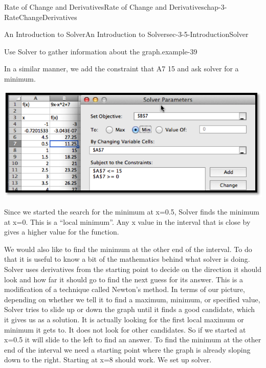 \documentclass[oneside,10pt,]{book}
\numberwithin{equation}{section}
\begin{document}
\begin{chapterptx}{Rate of Change and Derivatives}{}{Rate of Change and Derivatives}{}{}{chap-3-RateChangeDerivatives}
\begin{sectionptx}{An Introduction to Solver}{}{An Introduction to Solver}{}{}{sec-3-5-IntroductionSolver}
\begin{example}{Use Solver to gather information about the graph.}{example-39}
\begin{sidebyside}{1}{0.3}{0.3}{0}
\begin{sbspanel}{0.4}
\end{sbspanel}%
\end{sidebyside}%
\par
\hypertarget{p-1338}{}%
In a similar manner, we add the constraint that A7 15 and ask solver for a minimum.%
\begin{sidebyside}{1}{0.15}{0.15}{0}%
\begin{sbspanel}{0.7}%
\includegraphics[width=1\linewidth]{images/sec3-5-7.png}
\end{sbspanel}%
\end{sidebyside}%
\par
\hypertarget{p-1339}{}%
Since we started the search for the minimum at x=0.5, Solver finds the minimum at x=0.  This is a ``local minimum''.  Any x value in the interval that is close by gives a higher value for the function.%
\par
\hypertarget{p-1340}{}%
We would also like to find the minimum at the other end of the interval.  To do that it is useful to know a bit of the mathematics behind what solver is doing.  Solver uses derivatives from the starting point to decide on the direction it should look and how far it should go to find the next guess for its answer.  This is a modification of a technique called Newton’s method.  In terms of our picture, depending on whether we tell it to find a maximum, minimum, or specified value, Solver tries to slide up or down the graph until it finds a good candidate, which it gives us as a solution.  It is actually looking for the first local maximum or minimum it gets to.  It does not look for other candidates.  So if we started at x=0.5 it will slide to the left to find an answer.  To find the minimum at the other end of the interval we need a starting point where the graph is already sloping down to the right. Starting at x=8 should work.  We set up solver.%
\begin{sidebyside}{1}{0.15}{0.15}{0}%
\begin{sbspanel}{0.7}%

\end{sbspanel}
\end{sidebyside}
\end{example}
\end{sectionptx}
\end{chapterptx}
\end{document}
